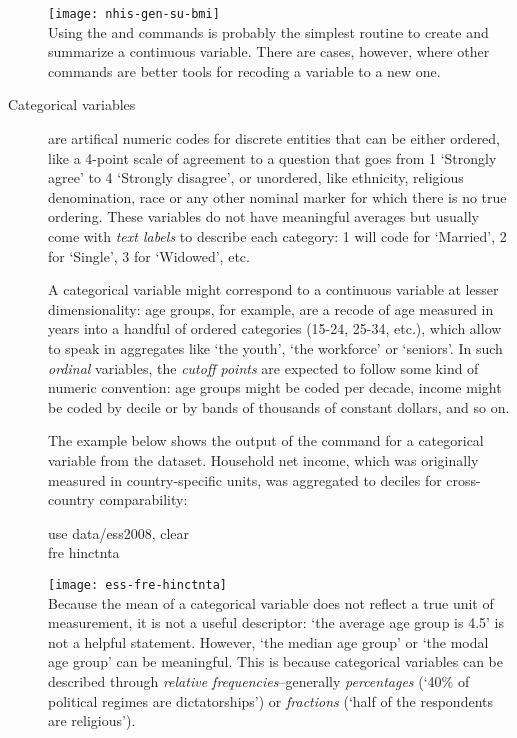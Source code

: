 \begin{description}
	\texttt{[image: nhis-gen-su-bmi]}\\[1em]
	
	Using the  and  commands is probably the simplest routine to create and summarize a continuous variable. There are cases, however, where other commands are better tools for recoding a variable to a new one.
	
	\item[Categorical variables] are artifical numeric codes for discrete entities that can be either ordered, like a 4-point scale of agreement to a question that goes from 1 `Strongly agree' to 4 `Strongly disagree', or unordered, like ethnicity, religious denomination, race or any other nominal marker for which there is no true ordering. These variables do not have meaningful averages but usually come with \emph{text labels} to describe each category: 1 will code for `Married', 2 for `Single', 3 for `Widowed', etc.

	A categorical variable might correspond to a continuous variable at lesser dimensionality: age groups, for example, are a recode of age measured in years into a handful of ordered categories (15-24, 25-34, etc.), which allow to speak in aggregates like `the youth', `the workforce' or `seniors'. In such \emph{ordinal} variables, the \emph{cutoff points} are expected to follow some kind of numeric convention: age groups might be coded per decade, income might be coded by decile or by bands of thousands of constant dollars, and so on.

	The example below shows the output of the  command for a categorical variable from the \ess dataset. Household net income, which was originally measured in country-specific units, was aggregated to deciles for cross-country comparability:\\[1em]

	\begin{docspec}
		use data/ess2008, clear\\
		fre hinctnta
	\end{docspec}

	\texttt{[image: ess-fre-hinctnta]}\\[1em]
	
	Because the mean of a categorical variable does not reflect a true unit of measurement, it is not a useful descriptor: `the average age group is 4.5' is not a helpful statement. However, `the median age group' or `the modal age group' can be meaningful. This is because categorical variables can be described through \emph{relative frequencies}--generally \emph{percentages} (`40\% of political regimes are dictatorships') or \emph{fractions} (`half of the respondents are religious').


\end{description}
